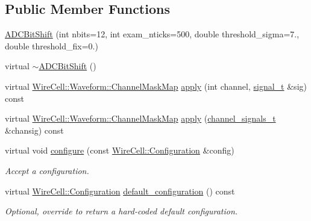 \subsection*{Public Member Functions}
\begin{DoxyCompactItemize}
\item 
\hyperlink{class_wire_cell_1_1_sig_proc_1_1_microboone_1_1_a_d_c_bit_shift_a50eda47740a592c281abd16bf121e27b}{A\+D\+C\+Bit\+Shift} (int nbits=12, int exam\+\_\+nticks=500, double threshold\+\_\+sigma=7., double threshold\+\_\+fix=0.)
\item 
virtual \hyperlink{class_wire_cell_1_1_sig_proc_1_1_microboone_1_1_a_d_c_bit_shift_ae4bc19ef240b81a20c7688abfbb8f0db}{$\sim$\+A\+D\+C\+Bit\+Shift} ()
\item 
virtual \hyperlink{namespace_wire_cell_1_1_waveform_a18b9ae61c858e340252ba3ac83ac3bc0}{Wire\+Cell\+::\+Waveform\+::\+Channel\+Mask\+Map} \hyperlink{class_wire_cell_1_1_sig_proc_1_1_microboone_1_1_a_d_c_bit_shift_a78c5feeb9f0ab8a04af03d75a8c83046}{apply} (int channel, \hyperlink{class_wire_cell_1_1_i_channel_filter_a434ed96cc4b805fa0eeec14f9f8d85e9}{signal\+\_\+t} \&sig) const
\item 
virtual \hyperlink{namespace_wire_cell_1_1_waveform_a18b9ae61c858e340252ba3ac83ac3bc0}{Wire\+Cell\+::\+Waveform\+::\+Channel\+Mask\+Map} \hyperlink{class_wire_cell_1_1_sig_proc_1_1_microboone_1_1_a_d_c_bit_shift_a6815b2cc680e5fb222239f2875773352}{apply} (\hyperlink{class_wire_cell_1_1_i_channel_filter_a44de35ce47701d84cd45393c6bcd5e2f}{channel\+\_\+signals\+\_\+t} \&chansig) const
\item 
virtual void \hyperlink{class_wire_cell_1_1_sig_proc_1_1_microboone_1_1_a_d_c_bit_shift_a9f38ca7b73b7a24d7ee38c6e90481fde}{configure} (const \hyperlink{namespace_wire_cell_a9f705541fc1d46c608b3d32c182333ee}{Wire\+Cell\+::\+Configuration} \&config)
\begin{DoxyCompactList}\small\item\em Accept a configuration. \end{DoxyCompactList}\item 
virtual \hyperlink{namespace_wire_cell_a9f705541fc1d46c608b3d32c182333ee}{Wire\+Cell\+::\+Configuration} \hyperlink{class_wire_cell_1_1_sig_proc_1_1_microboone_1_1_a_d_c_bit_shift_a6e3cf4cabba9a0490ddcca9b2c4f9b20}{default\+\_\+configuration} () const
\begin{DoxyCompactList}\small\item\em Optional, override to return a hard-\/coded default configuration. \end{DoxyCompactList}\end{DoxyCompactItemize}
